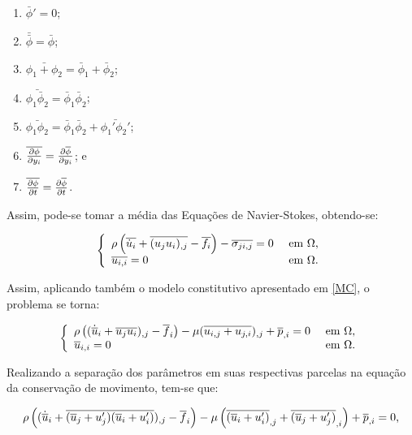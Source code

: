 \begin{enumerate}[label=\alph*.]
    \item $\bar{\phi}'=0$;
    \item $\bar{\bar{\phi}}=\bar{\phi}$;
    \item $\bar{\phi_1+\phi_2}=\bar{\phi}_1+\bar{\phi}_2$;
    \item $\bar{\phi_1\bar{\phi}_2}=\bar{\phi}_1\bar{\phi}_2$;
    \item $\bar{\phi_1\phi_2}=\bar{\phi}_1\bar{\phi}_2+\bar{\phi_1'\phi_2'}$;
    \item $\overline{\frac{\partial{\phi}}{\partial{y_i}}}=\frac{\partial{\overline{\phi}}}{\partial{y_i}}$; e
    \item $\overline{\frac{\partial{\phi}}{\partial{t}}}=\frac{\partial{\overline{\phi}}}{\partial{t}}$.
\end{enumerate}

Assim, pode-se tomar a média das Equações de Navier-Stokes, obtendo-se:

\begin{equation}
    \left\{
    \begin{array}{ll}
        \rho\left({\overline{\dot{u}_i}+\overline{(u_ju_i)_{,j}}-\overline{f_i}}\right)-\overline{\sigma_{ji,j}}=0 & \text{ em }\Omega\text{,} \\
        \overline{u_{i,i}}=0                                                                  & \text{ em }\Omega\text{.}
    \end{array}
    \right.
\end{equation}

Assim, aplicando também o modelo constitutivo apresentado em \ref{MC}, o problema se torna:

\begin{equation}
    \left\{
    \begin{array}{ll}
        \rho\left({(\dot{\overline{u}}_i+\overline{u_ju_i})_{,j}-\overline{f}_i}\right)-\mu(\overline{u_{i,j}+u_{j,i}})_{,j}+\overline{p}_{,i}=0 & \text{ em }\Omega\text{,} \\
        \overline{u}_{i,i}=0                                                                                           & \text{ em }\Omega\text{.}
    \end{array}
    \right.
\end{equation}

Realizando a separação dos parâmetros em suas respectivas parcelas na equação da conservação de movimento, tem-se que:

\begin{equation}
    \rho\left({(\dot{\overline{u}}_i+\overline{(\overline{u}_j+u'_j)(\overline{u}_i+u'_i)})_{,j}-\overline{f}_i}\right)-\mu\left({\overline{(\overline{u}_i+u'_i)}_{,j}+\overline{(\overline{u}_j+u'_j)}_{,i}}\right)+\overline{p}_{,i}=0\text{,}
\end{equation}

